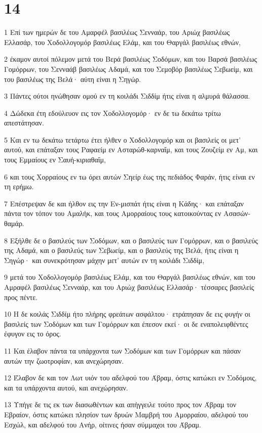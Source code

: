 \chapter{14}

\par 1 Επί των ημερών δε του Αμαρφέλ βασιλέως Σενναάρ, του Αριώχ βασιλέως Ελλασάρ, του Χοδολλογομόρ βασιλέως Ελάμ, και του Θαργάλ βασιλέως εθνών,
\par 2 έκαμον αυτοί πόλεμον μετά του Βερά βασιλέως Σοδόμων, και του Βαρσά βασιλέως Γομόρρων, του Σενναάβ βασιλέως Αδαμά, και του Σεμοβόρ βασιλέως Σεβωείμ, και του βασιλέως της Βελά· αύτη είναι η Σηγώρ.
\par 3 Πάντες ούτοι ηνώθησαν ομού εν τη κοιλάδι Σιδδίμ ήτις είναι η αλμυρά θάλασσα.
\par 4 Δώδεκα έτη εδούλευον εις τον Χοδολλογομόρ· εν δε τω δεκάτω τρίτω απεστάτησαν.
\par 5 Και εν τω δεκάτω τετάρτω έτει ήλθεν ο Χοδολλογομόρ και οι βασιλείς οι μετ' αυτού, και επάταξαν τους Ραφαείμ εν Ασταρώθ-καρναΐμ, και τους Ζουζείμ εν Αμ, και τους Εμμαίους εν Σαυή-κιριαθαΐμ,
\par 6 και τους Χορραίους εν τω όρει αυτών Σηείρ έως της πεδιάδος Φαράν, ήτις είναι εν τη ερήμω.
\par 7 Επέστρεψαν δε και ήλθον εις την Εν-μισπάτ ήτις είναι η Κάδης· και επάταξαν πάντα τον τόπον του Αμαλήκ, και τους Αμορραίους τους κατοικούντας εν Ασασών-θαμάρ.
\par 8 Εξήλθε δε ο βασιλεύς των Σοδόμων, και ο βασιλεύς των Γομόρρων, και ο βασιλεύς της Αδαμά, και ο βασιλεύς των Σεβωείμ, και ο βασιλεύς της Βελά, ήτις είναι η Σηγώρ· και συνεκρότησαν μάχην μετ' αυτών εν τη κοιλάδι Σιδδίμ,
\par 9 μετά του Χοδολλογομόρ βασιλέως Ελάμ, και του Θαργάλ βασιλέως εθνών, και του Αμραφέλ βασιλέως Σενναάρ, και του Αριώχ βασιλέως Ελλασάρ· τέσσαρες βασιλείς προς πέντε.
\par 10 Η δε κοιλάς Σιδδίμ ήτο πλήρης φρεάτων ασφάλτου· ετράπησαν δε εις φυγήν οι βασιλείς των Σοδόμων και των Γομόρρων και έπεσον εκεί· οι δε εναπολειφθέντες έφυγον εις το όρος.
\par 11 Και έλαβον πάντα τα υπάρχοντα των Σοδόμων και των Γομόρρων και πάσαν αυτών την ζωοτροφίαν, και ανεχώρησαν.
\par 12 Έλαβον δε και τον Λωτ υιόν του αδελφού του Άβραμ, όστις κατώκει εν Σοδόμοις, και τα υπάρχοντα αυτού, και ανεχώρησαν.
\par 13 Υπήγε δε τις εκ των διασωθέντων και απήγγειλε τούτο προς τον Άβραμ τον Εβραίον, όστις κατώκει πλησίον των δρυών Μαμβρή του Αμορραίου, αδελφού του Εσχώλ, και αδελφού του Ανήρ, οίτινες ήσαν σύμμαχοι του Άβραμ.
